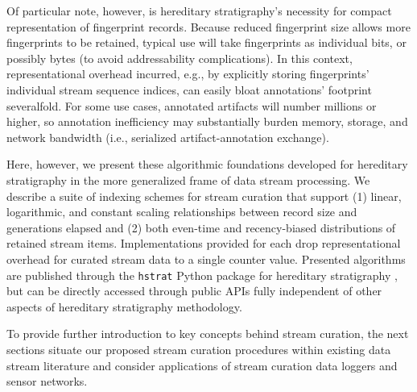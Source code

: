 Of particular note, however, is hereditary stratigraphy's necessity for compact representation of fingerprint records.
Because reduced fingerprint size allows more fingerprints to be retained, typical use will take fingerprints as individual bits, or possibly bytes (to avoid addressability complications).
In this context, representational overhead incurred, e.g., by explicitly storing fingerprints' individual stream sequence indices, can easily bloat annotations' footprint severalfold.
For some use cases, annotated artifacts will number millions or higher, so annotation inefficiency may substantially burden memory, storage, and network bandwidth (i.e., serialized artifact-annotation exchange).

Here, however, we present these algorithmic foundations developed for hereditary stratigraphy in the more generalized frame of data stream processing.
We describe a suite of indexing schemes for stream curation that support (1) linear, logarithmic, and constant scaling relationships between record size and generations elapsed and (2) both even-time and recency-biased distributions of retained stream items.
Implementations provided for each drop representational overhead for curated stream data to a single counter value.
Presented algorithms are published through the \texttt{hstrat} Python package for hereditary stratigraphy \citep{moreno2022hstrat}, but can be directly accessed through public APIs fully independent of other aspects of hereditary stratigraphy methodology.

To provide further introduction to key concepts behind stream curation, the next sections situate our proposed stream curation procedures within existing data stream literature and consider applications of stream curation data loggers and sensor networks.
